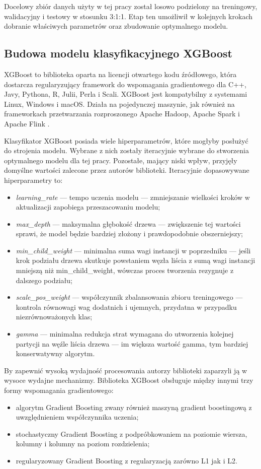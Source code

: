 \documentclass[polish, twoside, 12pt, a4paper]{article}
\theoremstyle{definition}
\theoremstyle{plain}
\theoremstyle{remark}
\begin{document}
Docelowy zbiór danych użyty w tej pracy został losowo podzielony na treningowy, walidacyjny i testowy w stosunku 3:1:1. Etap ten umożliwił w kolejnych krokach dobranie właściwych parametrów oraz zbudowanie optymalnego modelu.

\subsection{Budowa modelu klasyfikacyjnego XGBoost}

XGBoost to biblioteka oparta na licencji otwartego kodu źródłowego, która dostarcza regularyzujący framework do wspomagania gradientowego dla C++, Javy, Pythona, R, Julii, Perla i Scali. XGBoost jest kompatybilny z systemami Linux, Windows i macOS. Działa na pojedynczej maszynie, jak również na frameworkach przetwarzania rozproszonego Apache Hadoop, Apache Spark i Apache Flink \citep{chen2016}. 

Klasyfikator XGBoost posiada wiele hiperparametrów, które mogłyby posłużyć do strojenia modelu. Wybrane z nich zostały iteracyjnie wybrane do stworzenia optymalnego modelu dla tej pracy. Pozostałe, mający niski wpływ, przyjęły domyślne wartości zalecone przez autorów biblioteki. Iteracyjnie dopasowywane hiperparametry to:
\begin{itemize}[noitemsep]
 \item \emph{learning\_rate} --- tempo uczenia modelu --- zmniejszanie wielkości kroków w aktualizacji zapobiega przeszacowaniu modelu;
 \item \emph{max\_depth} --- maksymalna głębokość drzewa --- zwiększenie tej wartości sprawi, że model będzie bardziej złożony i prawdopodobnie obszerniejszy;
 \item \emph{min\_child\_weight} --- minimalna suma wagi instancji w poprzedniku --- jeśli krok podziału drzewa skutkuje powstaniem węzła liścia z sumą wagi instancji mniejszą niż min\_child\_weight, wówczas proces tworzenia rezygnuje z dalszego podziału;
 \item \emph{scale\_pos\_weight} --- współczynnik zbalansowania zbioru treningowego --- kontrola równowagi wag dodatnich i ujemnych, przydatna w przypadku niezrównoważonych klas;
 \item \emph{gamma} --- minimalna redukcja strat wymagana do utworzenia kolejnej partycji na węźle liścia drzewa --- im większa wartość gamma, tym bardziej konserwatywny algorytm.
\end{itemize}

By zapewnić wysoką wydajność procesowania autorzy biblioteki zaparzyli ją w wysoce wydajne mechanizmy. Biblioteka XGBoost obsługuje między innymi trzy formy wspomagania gradientowego:
\begin{itemize}[noitemsep]
  \item algorytm Gradient Boosting zwany również maszyną gradient boostingową z uwzględnieniem współczynnika uczenia;
  \item stochastyczny Gradient Boosting z podpróbkowaniem na poziomie wiersza, kolumny i kolumny na poziom rozdzielenia;
  \item regularyzowany Gradient Boosting z regularyzacją zarówno L1 jak i L2.
\end{itemize}
\end{document}

